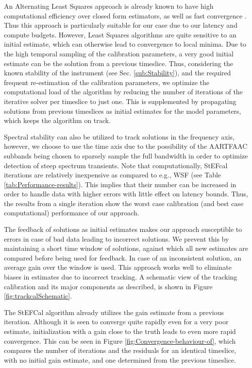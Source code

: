 \documentclass{aa}
\begin{document}
An  Alternating   Least  Squares  approach   is  already  known  to   have  high
computational  efficiency   over  closed  form  estimators,  as   well  as  fast
convergence  \citep{boonstra2003gain}.   Thus   this  approach  is  particularly
suitable for  our case due to  our latency and compute  budgets.  However, Least
Squares  algorithms  are quite  sensitive  to  an  initial estimate,  which  can
otherwise lead to convergence to local minima. Due to the high temporal sampling
of the calibration parameters, a very  good initial estimate can be the solution
from  a  previous timeslice.   Thus,  considering  the  known stability  of  the
instrument   (see  Sec.    \ref{sub:Stability}),  and   the   required  frequent
re-estimation of the calibration  parameters, we optimize the computational load
of the  algorithm by reducing the  number of iterations of  the iterative solver
per timeslice  to just one. This  is supplemented by  propagating solutions from
previous timeslices as  initial estimates for the model  parameters, which keeps
the  algorithm on  track. 

Spectral  stability can also  be utilized  to track  solutions in  the frequency
axis, however,  we choose to  use the  time axis due  to the possibility  of the
AARTFAAC subbands being chosen to sparsely sample the full bandwidth in order to
optimize  detection of  steep spectrum  transients.  Note  that computationally,
StEFcal  iterations are  relatively inexpensive  as compared  to e.g.,  WSF (see
Table  \ref{tab:Performance-results}).  This  implies that  their number  can be
increased  in order  to handle  data with  higher errors  with little  effect on
latency bounds.  Thus,  the results from a single iteration  show the worst case
calibration (and best case computational) performance of our approach.

The feedback of solutions as initial estimates makes our approach susceptible to
errors in case  of bad data leading to incorrect solutions.   We prevent this by
maintaining a  short time window of  solutions, against which  all new estimates
are  compared  before being  used  for feedback.   In  case  of an  inconsistent
solution, an average gain over the  window is used.  This approach works well to
eliminate biases in estimates due to incorrect tracking. A schematic view of the
tracking calibration  and its major components  as described, is  shown in Figure
\ref{fig:trackcalSchematic}.

The  StEFCal  algorithm already  utilizes  the  gain  estimate from  a  previous
iteration. Although  it is seen to converge  quite rapidly even for  a very poor
estimate, initialization with a gain close to the truth leads to even more rapid
convergence.   This can  be seen  in  Figure \ref{fig:Convergence-behaviour-of},
which  compares the  number of  iterations and  the residuals  for  an identical
timeslice, with no  initial gain estimate, and one  determined from the previous
timeslice.
\end{document}
